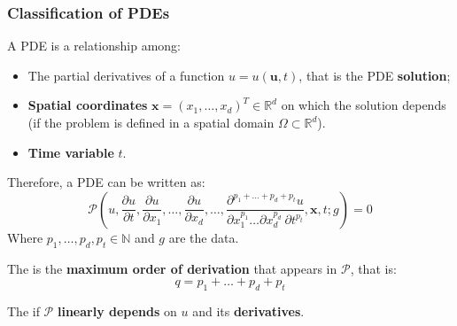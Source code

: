 \subsubsection{Classification of PDEs}

A PDE is a relationship among:
\begin{itemize}
    \item The partial derivatives of a function $u = u\left(\mathbf{u}, t\right)$, that is the PDE \textbf{solution};
    \item \textbf{Spatial coordinates} $\mathbf{x} = \left(x_{1}, \dots, x_{d}\right)^{T} \in \mathbb{R}^{d}$ on which the solution depends (if the problem is defined in a spatial domain $\Omega \subset \mathbb{R}^{d}$).
    \item \textbf{Time variable} $t$.
\end{itemize}
Therefore, a PDE can be written as:
\begin{equation}
    \mathcal{P}\left(
        u,
        \dfrac{\partial u}{\partial t},
        \dfrac{\partial u}{\partial x_{1}},
        \dots,
        \dfrac{\partial u}{\partial x_{d}},
        \dots,
        \dfrac{\partial^{p_{1} + \dots + p_{d} + p_{t}} u}{\partial x_{1}^{p_{1}} \dots \partial x_{d}^{p_{d}} \: \partial t^{p_{t}}},
        \mathbf{x},
        t;
        g
    \right) = 0
\end{equation}
Where $p_{1}, \dots, p_{d}, p_{t} \in \mathbb{N}$ and $g$ are the data.

\highspace
\begin{definitionbox}
    The  is the \textbf{maximum order of derivation} that appears in $\mathcal{P}$, that is:
    \begin{equation}
        q = p_{1} + \dots + p_{d} + p_{t}
    \end{equation}
\end{definitionbox}

\begin{definitionbox}
    The  if $\mathcal{P}$ \textbf{linearly depends} on $u$ and its \textbf{derivatives}.
\end{definitionbox}

